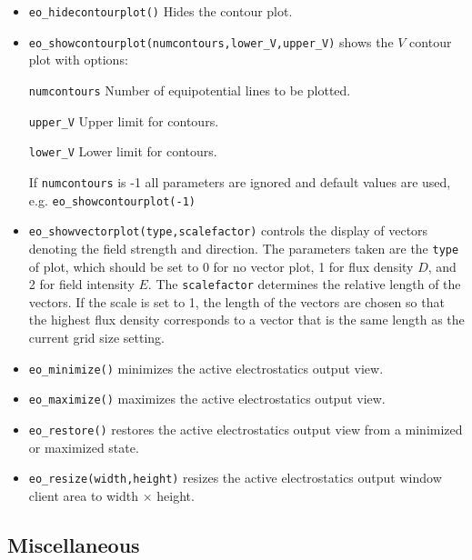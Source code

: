 \begin{itemize}
\item \texttt{eo\_hidecontourplot()} Hides the contour plot.

\item \texttt{eo\_showcontourplot(numcontours,lower{\_}V,upper{\_}V)} shows the
$V$ contour plot with options:

\texttt{numcontours} Number of equipotential lines to be plotted.

\texttt{upper{\_}V} Upper limit for contours.

\texttt{lower{\_}V} Lower limit for contours.

If \texttt{numcontours} is -1 all parameters are ignored and
default values are used, \\ e.g. \texttt{eo\_showcontourplot(-1)}

\item \texttt{eo\_showvectorplot(type,scalefactor)}
controls the display of vectors denoting the field strength and
direction. The parameters taken are the \texttt{type} of plot,
which should be set to 0 for no vector plot, 1 for flux density
$D$, and 2 for field intensity $E$. The \texttt{scalefactor}
determines the relative length of the vectors. If the scale is set
to 1, the length of the vectors are chosen so that the highest flux
density corresponds to a vector that is the same length as the
current grid size setting.

\item{\tt eo\_minimize()} minimizes the active electrostatics output view.

\item{\tt eo\_maximize()} maximizes the active electrostatics output view.

\item{\tt eo\_restore()} restores the active electrostatics output view from a
 minimized or maximized state.

\item{\tt eo\_resize(width,height)} resizes the active electrostatics output
 window client area to width $\times$ height.

\end{itemize}

\subsection{Miscellaneous}

